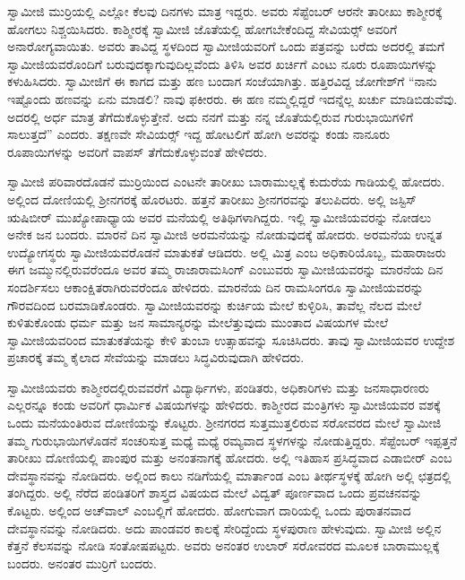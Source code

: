  ಸ್ವಾಮೀಜಿ ಮುರ‍್ರಿಯಲ್ಲಿ ಎಲ್ಲೋ ಕೆಲವು ದಿನಗಳು ಮಾತ್ರ ಇದ್ದರು. ಅವರು ಸೆಪ್ಟೆಂಬರ್ ಆರನೇ ತಾರೀಖು ಕಾಶ್ಮೀರಕ್ಕೆ ಹೋಗಲು ನಿಶ್ಚಯಿಸಿದರು. ಕಾಶ್ಮೀರಕ್ಕೆ ಸ್ವಾಮೀಜಿ ಜೊತೆಯಲ್ಲಿ ಹೋಗಬೇಕೆಂದಿದ್ದ ಸೇವಿಯರ್ಸ್‍‍ ಅವರಿಗೆ ಅನಾರೋಗ್ಯವಾಯಿತು. ಅವರು ತಾವಿದ್ದ ಸ್ಥಳದಿಂದ ಸ್ವಾಮೀಜಿಯವರಿಗೆ ಒಂದು ಪತ್ರವನ್ನು ಬರೆದು ಅದರಲ್ಲಿ ತಮಗೆ ಸ್ವಾಮೀಜಿಯವರೊಂದಿಗೆ ಬರುವುದಕ್ಕಾಗುವುದಿಲ್ಲವೆಂದು ತಿಳಿಸಿ ಅವರ ಖರ್ಚಿಗೆ ಎಂಟು ನೂರು ರೂಪಾಯಿಗಳನ್ನು ಕಳುಹಿಸಿದರು. ಸ್ವಾಮೀಜಿಗೆ ಈ ಕಾಗದ ಮತ್ತು ಹಣ ಬಂದಾಗ ಸಂಜೆಯಾಗಿತ್ತು. ಹತ್ತಿರವಿದ್ದ ಜೋಗೇಶ್‍ಗೆ “ನಾನು ಇಷ್ಟೊಂದು ಹಣವನ್ನು ಏನು ಮಾಡಲಿ? ನಾವು ಫಕೀರರು. ಈ ಹಣ ನಮ್ಮಲ್ಲಿದ್ದರೆ ಇದನ್ನೆಲ್ಲ ಖರ್ಚು ಮಾಡಿಬಿಡುವೆವು. ಅದರಲ್ಲಿ ಅರ್ಧ ಮಾತ್ರ ತೆಗೆದುಕೊಳ್ಳುತ್ತೇನೆ. ಅದು ನನಗೆ ಮತ್ತು ನನ್ನ ಜೊತೆಯಲ್ಲಿರುವ ಗುರುಭಾಯಿಗಳಿಗೆ ಸಾಲುತ್ತದೆ” ಎಂದರು. ತಕ್ಷಣವೇ ಸೇವಿಯರ್ಸ್‍‍ ಇದ್ದ ಹೋಟಲಿಗೆ ಹೋಗಿ ಅವರನ್ನು ಕಂಡು ನಾನೂರು ರೂಪಾಯಿಗಳನ್ನು ಅವರಿಗೆ ವಾಪಸ್ ತೆಗೆದುಕೊಳ್ಳುವಂತೆ ಹೇಳಿದರು. 

 ಸ್ವಾಮೀಜಿ ಪರಿವಾರದೊಡನೆ ಮುರ‍್ರಿಯಿಂದ ಎಂಟನೇ ತಾರೀಖು ಬಾರಾಮುಲ್ಲಕ್ಕೆ ಕುದುರೆಯ ಗಾಡಿಯಲ್ಲಿ ಹೋದರು. ಅಲ್ಲಿಂದ ದೋಣಿಯಲ್ಲಿ ಶ‍್ರೀನಗರಕ್ಕೆ ಹೊರಟರು. ಹತ್ತನೆ ತಾರೀಖು ಶ‍್ರೀನಗರವನ್ನು ತಲುಪಿದರು. ಅಲ್ಲಿ ಜಸ್ಟಿಸ್ ಋಷಿಬೀರ್ ಮುಖ್ಯೋಪಾಧ್ಯಾಯ ಅವರ ಮನೆಯಲ್ಲಿ ಅತಿಥಿಗಳಾಗಿದ್ದರು. ಇಲ್ಲಿ ಸ್ವಾಮೀಜಿಯವರನ್ನು ನೋಡಲು ಅನೇಕ ಜನ ಬಂದರು. ಮಾರನೆ ದಿನ ಸ್ವಾಮೀಜಿ ಅರಮನೆಯನ್ನು ನೋಡುವುದಕ್ಕೆ ಹೋದರು. ಅರಮನೆಯ ಉನ್ನತ ಉದ್ಯೋಗಸ್ಥರು ಸ್ವಾಮೀಜಿಯವರೊಡನೆ ಮಾತುಕತೆ ಆಡಿದರು. ಅಲ್ಲಿ ಮಿತ್ರ ಎಂಬ ಅಧಿಕಾರಿಯೊಬ್ಬ, ಮಹಾರಾಜರು ಈಗ ಜಮ್ಮುನಲ್ಲಿರುವರೆಂದೂ ಅವರ ತಮ್ಮ ರಾಜಾರಾಮಸಿಂಗ್ ಎಂಬುವರು ಸ್ವಾಮೀಜಿಯವರನ್ನು ಮಾರನೆಯ ದಿನ ಸಂದರ್ಶಿಸಲು ಆಕಾಂಕ್ಷಿತರಾಗಿರುವರೆಂದೂ ಹೇಳಿದರು. ಮಾರನೆಯ ದಿನ ರಾಮಸಿಂಗರೂ ಸ್ವಾಮೀಜಿಯವರನ್ನು ಗೌರವದಿಂದ ಬರಮಾಡಿಕೊಂಡರು. ಸ್ವಾಮೀಜಿಯವರನ್ನು ಕುರ್ಚಿಯ ಮೇಲೆ ಕುಳ್ಳಿರಿಸಿ, ತಾವೆಲ್ಲ ನೆಲದ ಮೇಲೆ ಕುಳಿತುಕೊಂಡು ಧರ್ಮ ಮತ್ತು ಜನ ಸಾಮಾನ್ಯರನ್ನು ಮೇಲೆತ್ತುವುದು ಮುಂತಾದ ವಿಷಯಗಳ ಮೇಲೆ ಸ್ವಾಮೀಜಿಯವರಿಂದ ಮಾತುಕತೆಯನ್ನು ಕೇಳಿ ತುಂಬಾ ಉತ್ಸಾಹವನ್ನು ಸೂಚಿಸಿದರು. ತಾವು ಸ್ವಾಮೀಜಿಯವರ ಉದ್ದೇಶ ಪ್ರಚಾರಕ್ಕೆ ತಮ್ಮ ಕೈಲಾದ ಸೇವೆಯನ್ನು ಮಾಡಲು ಸಿದ್ಧವಿರುವುದಾಗಿ ಹೇಳಿದರು. 

 ಸ್ವಾಮೀಜಿಯವರು ಕಾಶ್ಮೀರದಲ್ಲಿರುವವರೆಗೆ ವಿದ್ಯಾರ್ಥಿಗಳು, ಪಂಡಿತರು, ಅಧಿಕಾರಿಗಳು ಮತ್ತು ಜನಸಾಧಾರಣರು ಎಲ್ಲರನ್ನೂ ಕಂಡು ಅವರಿಗೆ ಧಾರ್ಮಿಕ ವಿಷಯಗಳನ್ನು ಹೇಳಿದರು. ಕಾಶ್ಮೀರದ ಮಂತ್ರಿಗಳು ಸ್ವಾಮೀಜಿಯವರ ವಶಕ್ಕೆ ಒಂದು ಮನೆಯಂತಿರುವ ದೋಣಿಯನ್ನು ಕೊಟ್ಟರು. ಶ‍್ರೀನಗರದ ಸುತ್ತಮುತ್ತಲಿರುವ ಸರೋವರದ ಮೇಲೆ ಸ್ವಾಮೀಜಿ ತಮ್ಮ ಗುರುಭಾಯಿಗಳೊಡನೆ ಸಂಚರಿಸುತ್ತ ಮಧ್ಯೆ ಮಧ್ಯೆ ರಮ್ಯವಾದ ಸ್ಥಳಗಳನ್ನು ನೋಡುತ್ತಿದ್ದರು. ಸೆಪ್ಟೆಂಬರ್ ಇಪ್ಪತ್ತನೆ ತಾರೀಖು ದೋಣಿಯಲ್ಲಿ ಪಾಂಪುರ ಮತ್ತು ಅನಂತನಾಗಕ್ಕೆ ಹೋದರು. ಅಲ್ಲಿ ಇತಿಹಾಸ ಪ್ರಸಿದ್ಧವಾದ ಎಡಾಬೀರ್ ಎಂಬ ದೇವಸ್ಥಾನವನ್ನು ನೋಡಿದರು. ಅಲ್ಲಿಂದ ಕಾಲು ನಡಿಗೆಯಲ್ಲಿ ಮಾರ್ತಾಂಡ ಎಂಬ ತೀರ್ಥಸ್ಥಳಕ್ಕೆ ಹೋಗಿ ಅಲ್ಲಿ ಛತ್ರದಲ್ಲಿ ತಂಗಿದ್ದರು. ಅಲ್ಲಿ ನೆರೆದ ಪಂಡಿತರಿಗೆ ಶಾಸ್ತ್ರದ ವಿಷಯದ ಮೇಲೆ ವಿದ್ವತ್ ಪೂರ್ಣವಾದ ಒಂದು ಪ್ರವಚನವನ್ನು ಕೊಟ್ಟರು. ಅಲ್ಲಿಂದ ಅಚ್‍ವಾಲ್ ಎಂಬಲ್ಲಿಗೆ ಹೋದರು. ಹೋಗುವಾಗ ದಾರಿಯಲ್ಲಿ ಒಂದು ಪುರಾತನವಾದ ದೇವಸ್ಥಾನವನ್ನು ನೋಡಿದರು. ಅದು ಪಾಂಡವರ ಕಾಲಕ್ಕೆ ಸೇರಿದ್ದೆಂದು ಸ್ಥಳಪುರಾಣ ಹೇಳುವುದು. ಸ್ವಾಮೀಜಿ ಅಲ್ಲಿನ ಕೆತ್ತನೆ ಕೆಲಸವನ್ನು ನೋಡಿ ಸಂತೋಷಪಟ್ಟರು. ಅವರು ಅನಂತರ ಉಲಾರ್ ಸರೋವರದ ಮೂಲಕ ಬಾರಾಮುಲ್ಲಕ್ಕೆ ಬಂದರು. ಅನಂತರ ಮುರ‍್ರಿಗೆ ಬಂದರು. 

